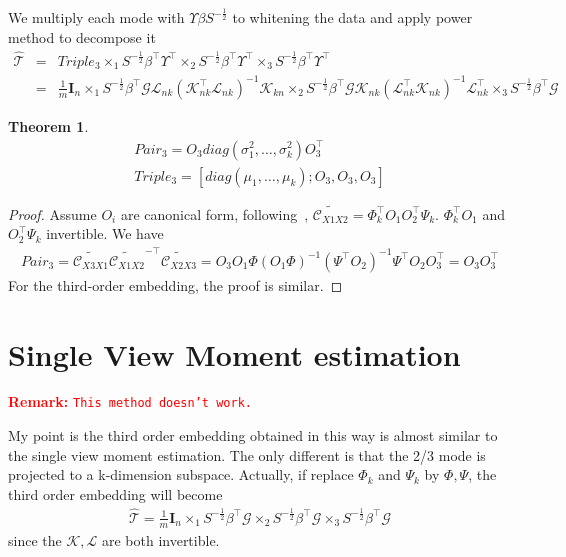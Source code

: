 \documentclass[11pt]{article}
\newcommand{\trans}{\top}
\newcommand{\bm}{\mathbf}
\newtheorem{thm}{Theorem}
\begin{document}
We multiply each mode with $\Upsilon \beta S^{-\frac{1}{2}}$ to
whitening the data and apply power method to decompose it
%
\begin{eqnarray*}
\hat{\mathcal{T}} &=& Triple_3 \times_1 S^{-\frac{1}{2}}\beta^\trans\Upsilon^\trans \times_2
S^{-\frac{1}{2}}\beta^\trans\Upsilon^\trans \times_3 S^{-\frac{1}{2}}\beta^\trans\Upsilon^\trans\\
&=& \frac{1}{m}\bm{I}_n \times_1
S^{-\frac{1}{2}}\beta^\trans\mathcal{G}\mathcal{L}_{nk}(\mathcal{K}_{nk}^\trans
\mathcal{L}_{nk})^{-1}\mathcal{K}_{kn} \times_2
S^{-\frac{1}{2}}\beta^\trans\mathcal{G}\mathcal{K}_{nk}(\mathcal{L}_{nk}^\trans
\mathcal{K}_{nk})^{-1}\mathcal{L}_{nk}^\trans \times_3
S^{-\frac{1}{2}}\beta^\trans\mathcal{G}
\end{eqnarray*}
%
\begin{thm}
\begin{eqnarray*}
Pair_3 = O_3 diag(\sigma^2_1,\ldots,\sigma^2_k) O_3^\trans\\
Triple_3 = [diag(\mu_1,\ldots,\mu_k); O_3, O_3, O_3]
\end{eqnarray*}
\end{thm}
\begin{proof}
Assume $O_i$ are canonical form, following~\cite{Anima12}, $\widetilde{\mathcal{C}_{X1X2}}= \Phi_k^\trans O_1 O_2^\trans \Psi_k$. $\Phi_k^\trans O_1$ and $O_2^\trans \Psi_k$ invertible. We have
\begin{eqnarray*}
Pair_3 = \widetilde{\mathcal{C}_{X3X1}}\widetilde{\mathcal{C}_{X1X2}}^{-\trans}\widetilde{\mathcal{C}_{X2X3}} = O_3O_1\Phi(O_1\Phi)^{-1}(\Psi^\trans O_2)^{-1}\Psi^\trans O_2O_3^\trans = O_3O_3^\trans
\end{eqnarray*}
For the third-order embedding, the proof is similar.
\end{proof}



\section{Single View Moment estimation}
\textcolor{red}{\textbf{Remark: }\texttt{This method doesn't work.}}

My point is the third order embedding obtained in this way is almost similar to the single view moment estimation. The only different is that the 2/3 mode is projected to a k-dimension subspace. Actually, if replace $\Phi_k$ and $\Psi_k$ by $\Phi, \Psi$, the third order embedding will become
\begin{eqnarray*}
\hat{\mathcal{T}}= \frac{1}{m}\bm{I}_n \times_1
S^{-\frac{1}{2}}\beta^\trans\mathcal{G} \times_2
S^{-\frac{1}{2}}\beta^\trans \mathcal{G}\times_3
S^{-\frac{1}{2}}\beta^\trans\mathcal{G}
\end{eqnarray*}
since the $\mathcal{K,L}$ are both invertible.
\end{document}
